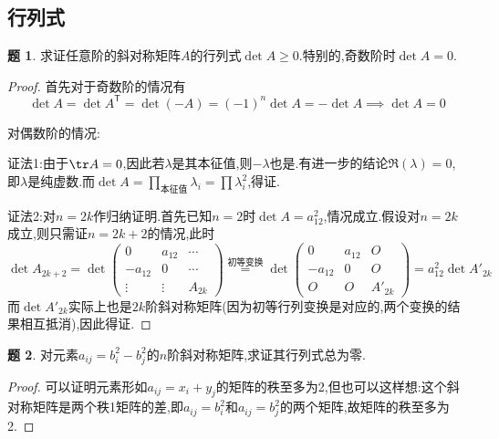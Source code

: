 \documentclass{article}
\newcommand{\T}{\mathsf{T}}
\theoremstyle{definition}
\newtheorem{exercise}{题}[section]
\begin{document}
\subsection{行列式}
\begin{exercise}
    求证任意阶的斜对称矩阵$A$的行列式$\det A\geq 0$.特别的,奇数阶时$\det A=0$.
\end{exercise}
\begin{proof}
    首先对于奇数阶的情况有$$\det A=\det A^\T=\det(-A)=(-1)^n\det A=-\det A\implies \det A=0$$

    对偶数阶的情况:

    证法1:由于$\tr A=0$,因此若$\lambda$是其本征值,则$-\lambda$也是.有进一步的结论$\Re(\lambda)=0$,即$\lambda$是纯虚数.而$\det A=\prod_{\text{本征值}}\lambda_i=\prod \lambda_i^2$,得证.

    证法2:对$n=2k$作归纳证明.首先已知$n=2$时$\det A=a_{12}^2$,情况成立.假设对$n=2k$成立,则只需证$n=2k+2$的情况,此时
    $$\det A_{2k+2}=\det \begin{pmatrix}
        0&a_{12}&\cdots\\ -a_{12}&0&\cdots\\\vdots&\vdots& A_{2k}
    \end{pmatrix}\stackrel{\text{初等变换}}{=}\det \begin{pmatrix}
        0&a_{12}&O\\ -a_{12}&0&O\\O&O& A'_{2k}
    \end{pmatrix}=a_{12}^2\det A'_{2k}$$
    而$\det A'_{2k}$实际上也是$2k$阶斜对称矩阵(因为初等行列变换是对应的,两个变换的结果相互抵消),因此得证.
\end{proof}

\begin{exercise}
    对元素$a_{ij}=b^2_i-b^2_j$的$n$阶斜对称矩阵,求证其行列式总为零.
\end{exercise}
\begin{proof}
    可以证明元素形如$a_{ij}=x_i+y_j$的矩阵的秩至多为2,但也可以这样想:这个斜对称矩阵是两个秩1矩阵的差,即$a_{ij}=b^2_i$和$a_{ij}=b^2_j$的两个矩阵,故矩阵的秩至多为2.
\end{proof}
\end{document}
